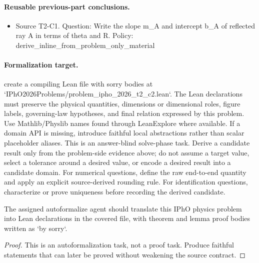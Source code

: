 \paragraph{Reusable previous-part conclusions.}
\begin{itemize}
\item Source T2-C1. Question: Write the slope m\_A and intercept b\_A of reflected ray A in terms of theta and R. Policy: derive\_inline\_from\_problem\_only\_material
\end{itemize}

\paragraph{Formalization target.}
create a compiling Lean file with sorry bodies at `IPhO2026Problems/problem\_ipho\_2026\_t2\_c2.lean`.
The Lean declarations must preserve the physical quantities, dimensions or dimensional roles, figure labels, governing-law hypotheses, and final relation expressed by this problem.
Use Mathlib/Physlib names found through LeanExplore where available. If a domain API is missing, introduce faithful local abstractions rather than scalar placeholder aliases.
This is an answer-blind solve-phase task. Derive a candidate result only from the problem-side evidence above; do not assume a target value, select a tolerance around a desired value, or encode a desired result into a candidate domain.
For numerical questions, define the raw end-to-end quantity and apply an explicit source-derived rounding rule. For identification questions, characterize or prove uniqueness before recording the derived candidate.

\begin{theorem}
\label{thm:physics:ipho_2026_t2_c2:target}
\leanok
The assigned autoformalize agent should translate this IPhO physics problem into Lean declarations in the covered file, with theorem and lemma proof bodies written as `by sorry`.
\end{theorem}
\begin{proof}

\leanok
This is an autoformalization task, not a proof task. Produce faithful statements that can later be proved without weakening the source contract.
\end{proof}
